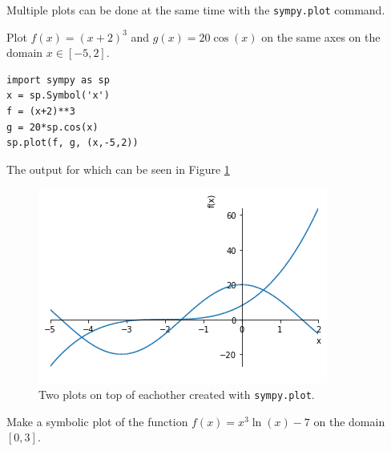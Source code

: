 Multiple plots can be done at the same time with the \texttt{sympy.plot} command.

\begin{example}
    Plot $f(x) = (x+2)^3$ and $g(x) = 20\cos(x)$ on the same axes on the domain $x \in
    [-5,2]$.

\bcode
\begin{lstlisting}
import sympy as sp
x = sp.Symbol('x')
f = (x+2)**3
g = 20*sp.cos(x)
sp.plot(f, g, (x,-5,2))
\end{lstlisting}
The output for which can be seen in Figure \ref{fig:sympy_plot_2}
\end{example}

\begin{figure}[ht!]
    \centering
    \includegraphics[width=0.6\columnwidth]{Images/sympy_plot_2.png}
    \caption{Two plots on top of eachother created with \texttt{sympy.plot}.}
    \label{fig:sympy_plot_2}
\end{figure}


\begin{problem}
    Make a symbolic plot of the function $f(x) = x^3 \ln(x) - 7$ on the domain $[0,3]$.
\end{problem}



